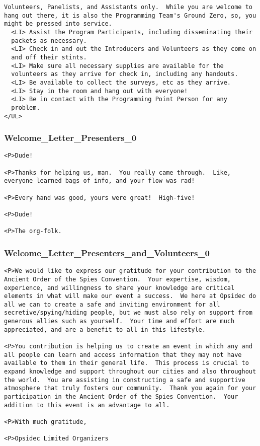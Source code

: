 \documentclass[captions=tablesignature]{scrartcl}
\begin{document}
\begin{verbatim}
Volunteers, Panelists, and Assistants only.  While you are welcome to
hang out there, it is also the Programming Team's Ground Zero, so, you
might be pressed into service.
  <LI> Assist the Program Participants, including disseminating their
  packets as necessary.
  <LI> Check in and out the Introducers and Volunteers as they come on
  and off their stints.
  <LI> Make sure all necessary supplies are available for the
  volunteers as they arrive for check in, including any handouts.
  <LI> Be available to collect the surveys, etc as they arrive.
  <LI> Stay in the room and hang out with everyone!
  <LI> Be in contact with the Programming Point Person for any
  problem.
</UL>
\end{verbatim}

\subsubsection{Welcome\_Letter\_Presenters\_0}
\label{sec-3-5-6}
\begin{verbatim}
<P>Dude!

<P>Thanks for helping us, man.  You really came through.  Like,
everyone learned bags of info, and your flow was rad!

<P>Every hand was good, yours were great!  High-five!

<P>Dude!

<P>The org-folk.
\end{verbatim}

\subsubsection{Welcome\_Letter\_Presenters\_and\_Volunteers\_0}
\label{sec-3-5-7}
\begin{verbatim}
<P>We would like to express our gratitude for your contribution to the
Ancient Order of the Spies Convention.  Your expertise, wisdom,
experience, and willingness to share your knowledge are critical
elements in what will make our event a success.  We here at Opsidec do
all we can to create a safe and inviting environment for all
secretive/spying/hiding people, but we must also rely on support from
generous allies such as yourself.  Your time and effort are much
appreciated, and are a benefit to all in this lifestyle.

<P>You contribution is helping us to create an event in which any and
all people can learn and access information that they may not have
available to them in their general life.  This process is crucial to
expand knowledge and support throughout our cities and also throughout
the world.  You are assisting in constructing a safe and supportive
atmosphere that truly fosters our community.  Thank you again for your
participation in the Ancient Order of the Spies Convention.  Your
addition to this event is an advantage to all.

<P>With much gratitude,

<P>Opsidec Limited Organizers
\end{verbatim}
\end{document}
